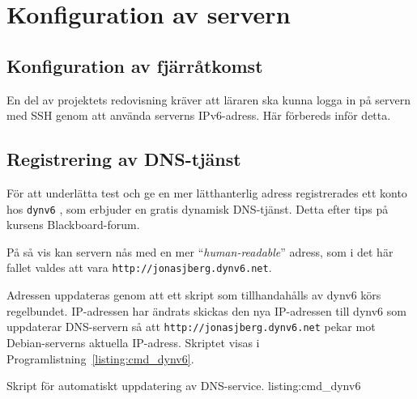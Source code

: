 %
%
%


\section{Konfiguration av servern}
\subsection{Konfiguration av fjärråtkomst}
En del av projektets redovisning kräver att läraren ska kunna logga in på servern
med SSH genom att använda serverns IPv6-adress. Här förbereds inför detta.


\subsection{Registrering av DNS-tjänst}
För att underlätta test och ge en mer lätthanterlig adress registrerades ett
konto hos \texttt{dynv6} \cite{ipv6:dynv6}, som erbjuder en gratis dynamisk
DNS-tjänst. Detta efter tips på kursens Blackboard-forum.

På så vis kan servern nås med en mer ``\emph{human-readable}'' adress,
som i det här fallet valdes att vara \texttt{http://jonasjberg.dynv6.net}.


Adressen uppdateras genom att ett skript som tillhandahålls \cite{ipv6:dynv6sh}
av dynv6 körs regelbundet. IP-adressen har ändrats skickas den nya IP-adressen
till dynv6 som uppdaterar DNS-servern så att
\texttt{http://jonasjberg.dynv6.net} pekar mot Debian-serverns aktuella
IP-adress.  Skriptet visas i Programlistning~\ref{listing:cmd_dynv6}.

            {Skript för automatiskt uppdatering av DNS-service.}
            {listing:cmd_dynv6}

